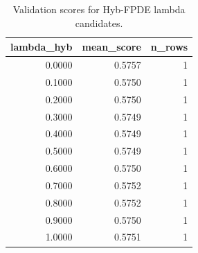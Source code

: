 \begin{table}[t]
\caption{Validation scores for Hyb-FPDE lambda candidates.}
\label{tab:lambda_distribution_computed}
\centering
\begin{tabular}{rrr}
\toprule
lambda\_hyb & mean\_score & n\_rows \\
\midrule
0.0000 & 0.5757 & 1 \\
0.1000 & 0.5750 & 1 \\
0.2000 & 0.5750 & 1 \\
0.3000 & 0.5749 & 1 \\
0.4000 & 0.5749 & 1 \\
0.5000 & 0.5749 & 1 \\
0.6000 & 0.5750 & 1 \\
0.7000 & 0.5752 & 1 \\
0.8000 & 0.5752 & 1 \\
0.9000 & 0.5750 & 1 \\
1.0000 & 0.5751 & 1 \\
\bottomrule
\end{tabular}

\end{table}
